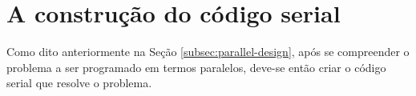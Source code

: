 \section{A construção do código serial}

Como dito anteriormente na Seção \ref{subsec:parallel-design}, 
após se compreender o problema a ser programado em termos paralelos,
deve-se então criar o código serial que resolve o problema.
